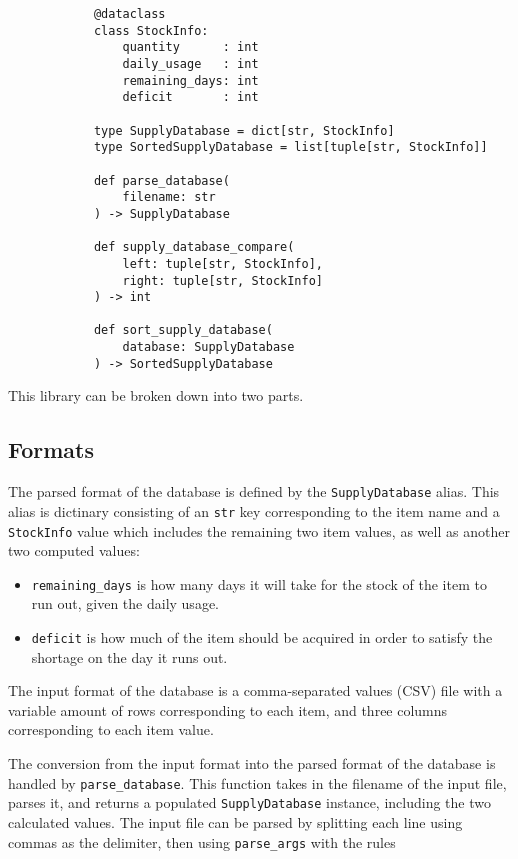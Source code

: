 \documentclass{article}
\begin{document}
		\begin{verbatim}
			@dataclass
			class StockInfo:
				quantity      : int
				daily_usage   : int
				remaining_days: int
				deficit       : int

			type SupplyDatabase = dict[str, StockInfo]
			type SortedSupplyDatabase = list[tuple[str, StockInfo]]

			def parse_database(
				filename: str
			) -> SupplyDatabase

			def supply_database_compare(
				left: tuple[str, StockInfo],
				right: tuple[str, StockInfo]
			) -> int

			def sort_supply_database(
				database: SupplyDatabase
			) -> SortedSupplyDatabase
		\end{verbatim}

		This library can be broken down into two parts.

		\subsection{Formats}
			The parsed format of the database is defined by the \verb|SupplyDatabase| alias. This
			alias is dictinary consisting of an \verb|str| key corresponding to the item name and a
			\verb|StockInfo| value which includes the remaining two item values, as well as another
			two computed values:

			\begin{itemize}
				\item \verb|remaining_days| is how many days it will take for the stock of the item
				to run out, given the daily usage.
				\item \verb|deficit| is how much of the item should be acquired in order to satisfy
				the shortage on the day it runs out.
			\end{itemize}

			The input format of the database is a comma-separated values (CSV) file with a variable
			amount of rows corresponding to each item, and three columns corresponding to each item
			value.

			The conversion from the input format into the parsed format of the database is handled
			by \verb|parse_database|. This function takes in the filename of the input file, parses
			it, and returns a populated \verb|SupplyDatabase| instance, including the two
			calculated values. The input file can be parsed by splitting each line using commas as
			the delimiter, then using \verb|parse_args| with the rules
\end{document}
